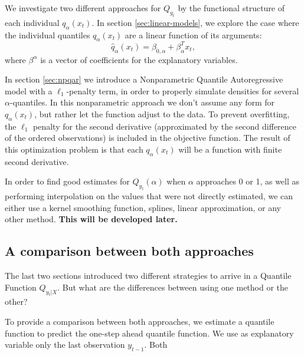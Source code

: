 We investigate two different approaches for $Q_{y_t}$ by the functional structure of each individual $q_\alpha(x_t)$.
In section \ref{sec:linear-models}, we explore the case where the individual quantiles $q_\alpha(x_t)$ are a linear function of its arguments:
\begin{equation}
\hat{q}_\alpha(x_t) = \beta_{0,\alpha} +   \beta_\alpha^T x_t,
\label{eq:fun-quantile}
\end{equation}
where $\beta^\alpha$ is a vector of coefficients for the explanatory variables.

In section \ref{sec:npqar} we introduce a Nonparametric Quantile Autoregressive model with a $\ell_{1}$-penalty term, in order to properly simulate densities for several $\alpha$-quantiles. In this nonparametric approach we don't assume any form for $q_\alpha(x_t)$, but rather let the function adjust to the data. To prevent overfitting, the $\ell_1$ penalty for the second derivative (approximated by the second difference of the ordered observations) is included in the objective function. The result of this optimization problem is that each $q_\alpha(x_t)$ will be a function with finite second derivative.

In order to find good estimates for $Q_{y_{t}}(\alpha)$ when $\alpha$ approaches 0 or 1, as well as performing interpolation on the values that were not directly estimated, we can either use a kernel smoothing function, splines, linear approximation, or any other method. 
\textbf{This will be developed later.}







\subsection{A comparison between both approaches}

The last two sections introduced two different strategies to arrive in a Quantile Function $Q_{y_t|X}$. But what are the differences between using one method or the other? 

To provide a comparison between both approaches, we estimate a quantile function to predict the one-step ahead quantile function. We use as explanatory variable only the last observation $y_{t-1}$. Both 


